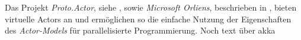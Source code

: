 Das Projekt \textit{Proto.Actor}, siehe \cite{?}, sowie \textit{Microsoft Orliens}, beschrieben in \cite{?}, bieten virtuelle  Actors an und ermöglichen so die einfache Nutzung der Eigenschaften des \textit{Actor-Models} für parallelisierte Programmierung. Noch text über akka

% 
% 
